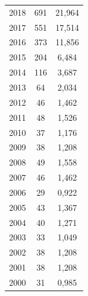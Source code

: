\begin{table}[b]
\begin{center}
\begin{tabular}{|c|c|c|}
2018&691&21,964\hphantom{9}\\


2017&551&17,514\hphantom{9}\\


2016&373&11,856\hphantom{9}\\


2015&204&6,484\\


2014&116&3,687\\


2013&\hphantom{9}64&2,034\\


2012&\hphantom{9}46&1,462\\


2011&\hphantom{9}48&1,526\\


2010&\hphantom{9}37&1,176\\


2009&\hphantom{9}38&1,208\\


2008&\hphantom{9}49&1,558\\


2007&\hphantom{9}46&1,462\\


2006&\hphantom{9}29&0,922\\


2005&\hphantom{9}43&1,367\\


2004&\hphantom{9}40&1,271\\


2003&\hphantom{9}33&1,049\\


2002&\hphantom{9}38&1,208\\


2001&\hphantom{9}38&1,208\\


2000&\hphantom{9}31&0,985\\


\hline


\end{tabular}


\end{center}












\end{table}
